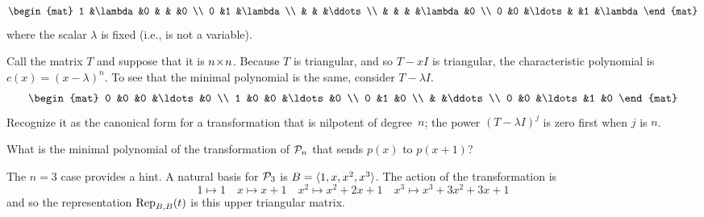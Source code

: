 \begin{exercises}
\begin{equation*}
\begin{mat}
        1        &\lambda  &0          &        &        &0  \\
        0        &1        &\lambda                          \\
                 &         &           &\ddots                \\
                 &         &           &        &\lambda &0   \\
        0        &0        &\ldots     &        &1       &\lambda
      \end{mat}
    \end{equation*}
    where the scalar $\lambda$ is fixed (i.e., is not a variable).
    \begin{answer}
      Call the matrix $T$ and suppose that it is \( \nbyn{n} \).
      Because $T$ is triangular, and so $T-xI$ is triangular,
      the characteristic polynomial is $c(x)=(x-\lambda)^n$.
      To see that the minimal polynomial is the same, consider
      $T-\lambda I$.
      \begin{equation*}
        \begin{mat}
          0        &0        &0          &\ldots  &0  \\
          1        &0        &0          &\ldots  &0  \\
          0        &1        &0                       \\
                   &         &\ddots                  \\
          0        &0        &\ldots     &1       &0      
        \end{mat}
      \end{equation*}
      Recognize it as the canonical form for a transformation that is 
      nilpotent of degree~$n$; the power $(T-\lambda I)^j$ is zero first
      when $j$ is $n$.
    \end{answer}
  \item 
    What is the minimal polynomial of the transformation of
    \( \polyspace_n \) that sends \( p(x) \) to \( p(x+1) \)?
    \begin{answer}
      The $n=3$ case provides a hint.
      A natural basis for $\polyspace_3$ is  
      $B=\sequence{1,x,x^2,x^3}$.
      The action of the transformation is
      \begin{equation*}
        1\mapsto 1
        \quad
        x\mapsto x+1
        \quad
        x^2\mapsto x^2+2x+1
        \quad
        x^3\mapsto x^3+3x^2+3x+1
      \end{equation*}
      and so the representation $\rep{t}{B,B}$ is this upper triangular matrix.

\end{answer}
\end{exercises}
